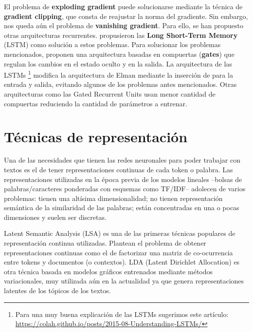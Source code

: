 El problema de \textbf{exploding gradient} puede solucionarse mediante la técnica de \textbf{gradient clipping}, que consta de reajustar la norma del gradiente. Sin embargo, nos queda aún el problema de \textbf{vanishing gradient}. Para ello, se han propuesto otras arquitecturas recurrentes. \citet{hochreiter1997long} propusieron las \textbf{Long Short-Term Memory} (LSTM) como solución a estos problemas. Para solucionar los problemas mencionados, proponen una arquitectura basadas en compuertas (\textbf{gates}) que regulan los cambios en el estado oculto y en la salida. La arquitectura de las LSTMs \footnote{Para una muy buena explicación de las LSTMs sugerimos este artículo: \url{https://colah.github.io/posts/2015-08-Understanding-LSTMs/}} modifica la arquitectura de Elman mediante la inserción de  para la entrada y salida, evitando algunos de los problemas antes mencionados. Otras arquitecturas como las Gated Recurrent Units \cite{cho-etal-2014-learning} usan menor cantidad de compuertas reduciendo la cantidad de parámetros a entrenar.

\section{Técnicas de representación}
\label{sec:02_representaciones}

Una de las necesidades que tienen las redes neuronales para poder trabajar con textos es el de tener representaciones continuas de cada token o palabra. Las representaciones utilizadas en la época previa de los modelos lineales --bolsas de palabras/caracteres ponderadas con esquemas como TF/IDF-- adolecen de varios problemas: tienen una altísima dimensionalidad; no tienen representación semántica de la similaridad de las palabras; están concentradas en una o pocas dimensiones y suelen ser discretas.

Latent Semantic Analysis (LSA) \cite{landauer1997solution} es una de las primeras técnicas populares de representación continua utilizadas. Plantean el problema de obtener representaciones continuas como el de factorizar una matriz de co-ocurrencia entre tokens y documentos (o contextos). LDA (Latent Dirichlet Allocation) \cite{blei2003latent} es otra técnica basada en modelos gráficos entrenados mediante métodos variacionales, muy utilizada aún en la actualidad ya que genera representaciones latentes de los tópicos de los textos.

